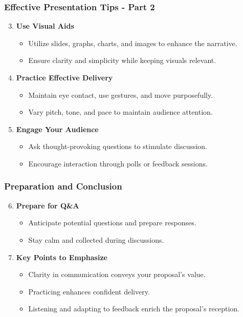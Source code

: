 \documentclass[aspectratio=169]{beamer}
\begin{document}
\begin{frame}[fragile]
    \frametitle{Effective Presentation Tips - Part 2}
    \begin{enumerate}
        \setcounter{enumi}{2}
        \item \textbf{Use Visual Aids}
        \begin{itemize}
            \item Utilize slides, graphs, charts, and images to enhance the narrative.
            \item Ensure clarity and simplicity while keeping visuals relevant.
        \end{itemize}
        
        \item \textbf{Practice Effective Delivery}
        \begin{itemize}
            \item Maintain eye contact, use gestures, and move purposefully.
            \item Vary pitch, tone, and pace to maintain audience attention.
        \end{itemize}
        
        \item \textbf{Engage Your Audience}
        \begin{itemize}
            \item Ask thought-provoking questions to stimulate discussion.
            \item Encourage interaction through polls or feedback sessions.
        \end{itemize}
    \end{enumerate}
\end{frame}

\begin{frame}[fragile]
    \frametitle{Preparation and Conclusion}
    \begin{enumerate}
        \setcounter{enumi}{5}
        \item \textbf{Prepare for Q\&A}
        \begin{itemize}
            \item Anticipate potential questions and prepare responses.
            \item Stay calm and collected during discussions.
        \end{itemize}

        \item \textbf{Key Points to Emphasize}
        \begin{itemize}
            \item Clarity in communication conveys your proposal's value.
            \item Practicing enhances confident delivery.
            \item Listening and adapting to feedback enrich the proposal's reception.
        \end{itemize}
    \end{enumerate}
\end{frame}
\end{document}
